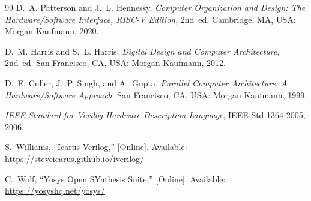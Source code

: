 \documentclass[conference]{IEEEtran}
\begin{document}
\begin{thebibliography}{99}
D.~A. Patterson and J.~L. Hennessy, \emph{Computer Organization and Design:
The Hardware/Software Interface, RISC-V Edition}, 2nd~ed. Cambridge, MA, USA:
Morgan Kaufmann, 2020.

D.~M. Harris and S.~L. Harris, \emph{Digital Design and Computer
Architecture}, 2nd~ed. San Francisco, CA, USA: Morgan Kaufmann, 2012.

D.~E. Culler, J.~P. Singh, and A.~Gupta, \emph{Parallel Computer
Architecture: A Hardware/Software Approach}. San Francisco, CA, USA: Morgan
Kaufmann, 1999.

\emph{IEEE Standard for Verilog Hardware Description Language}, IEEE Std
1364-2005, 2006.

S.~Williams, ``Icarus Verilog,'' [Online]. Available:
\url{https://steveicarus.github.io/iverilog/}

C.~Wolf, ``Yosys Open SYnthesis Suite,'' [Online]. Available:
\url{https://yosyshq.net/yosys/}

\end{thebibliography}
\end{document}
